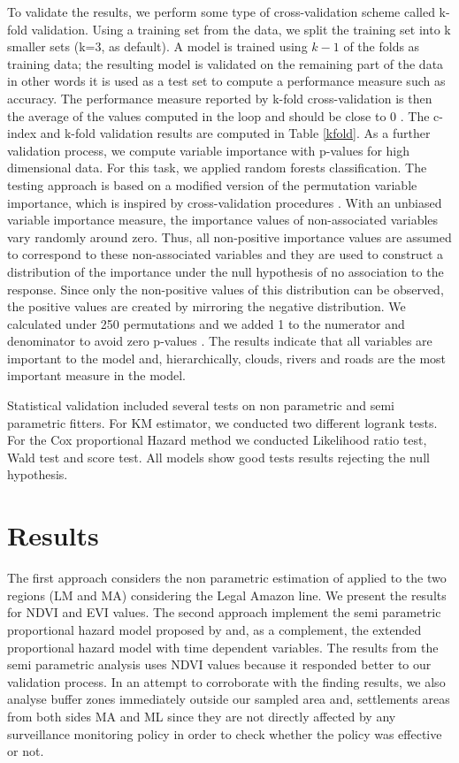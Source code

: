 To validate the results, we perform some type of cross-validation scheme called k-fold validation. Using a training set from the data, we split the training set into k smaller sets (k=3, as default). A model is trained using $k-1$ of the folds as training data;
the resulting model is validated on the remaining part of the data in other words it is used as a test set to compute a performance measure such as accuracy. The performance measure reported by k-fold cross-validation is then the average of the values computed in the loop and should be close to 0 \citep{scikit-learn}. The c-index and k-fold validation results are computed in Table \ref{kfold}. As a further validation process, we compute variable importance with p-values for high dimensional data. For this task, we applied random forests classification. The testing approach is based on a modified version of the permutation variable importance, which is inspired by cross-validation procedures \citep{Janitza2016}. With an unbiased variable importance measure, the importance values of non-associated variables vary randomly around zero. Thus, all non-positive importance values are assumed to correspond to these non-associated variables and they are used to construct a distribution of the importance under the null hypothesis of no association to the response. Since only the non-positive values of this distribution can be observed, the positive values are created by mirroring the negative distribution. We calculated under 250 permutations and we added 1 to the numerator and denominator to avoid zero p-values \citep{ranger_2018}. The results indicate that all variables are important to the model and, hierarchically, clouds, rivers and roads are the most important measure in the model.

Statistical validation included several tests on non parametric and semi parametric fitters. For KM estimator, we conducted two different logrank tests. For the Cox proportional Hazard method we conducted Likelihood ratio test, Wald test and score test. All models show good tests results rejecting the null hypothesis. 

\section{Results}  %
\label{S:3}
The first approach considers the non parametric estimation of \citet{kaplanandmeier} applied to the two regions (LM and MA) considering the Legal Amazon line. We present the results for NDVI and EVI values. The second approach implement the semi parametric proportional hazard model proposed by \citet{Cox1972} and, as a complement, the extended proportional hazard model with time dependent variables. The results from the semi parametric analysis uses NDVI values because it responded better to our validation process. In an attempt to corroborate with the finding results, we also analyse buffer zones immediately outside our sampled area and, settlements areas from both sides MA and ML since they are not directly affected by any surveillance monitoring policy in order to check whether the policy was effective or not.

